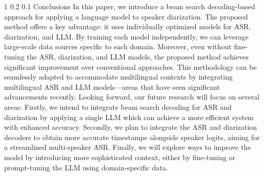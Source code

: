 \documentclass{article}
\makeatletter
\renewcommand{\section}{\@startsection
  {section}%
  {1}%
  {}%
  {0.2\baselineskip}%
  {0.1\baselineskip}%
  {}
}%
\makeatother
\begin{document}
\section{Conclusions}
In this paper, we introduce a beam search decoding-based approach for applying a language model to speaker diarization. The proposed method offers a key advantage: it uses individually optimized models for ASR, diarization, and LLM. By training each model independently, we can leverage large-scale data sources specific to each domain. Moreover, even without fine-tuning the ASR, diarization, and LLM models, the proposed method achieves significant improvement over conventional approaches. This methodology can be seamlessly adapted to accommodate multilingual contexts by integrating multilingual ASR and LLM models—areas that have seen significant advancements recently. Looking forward, our future research will focus on several areas: Firstly, we intend to integrate beam search decoding for ASR and diarization by applying a single LLM which can achieve a more efficient system with enhanced accuracy. Secondly, we plan to integrate the ASR and diarization decoders to obtain more accurate timestamps alongside speaker logits, aiming for a streamlined multi-speaker ASR. Finally, we will explore ways to improve the model by introducing more sophisticated context, either by fine-tuning or prompt-tuning the LLM using domain-specific data.
\clearpage

\vfill


\end{document}
